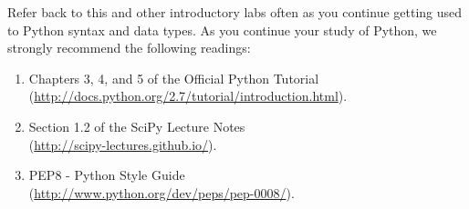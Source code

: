Refer back to this and other introductory labs often as you continue getting used to Python syntax and data types.
As you continue your study of Python, we strongly recommend the following readings:
\begin{enumerate}
\item Chapters 3, 4, and 5 of the Official Python Tutorial \\
        (\url{http://docs.python.org/2.7/tutorial/introduction.html}).
\item Section 1.2 of the SciPy Lecture Notes\\
        (\url{http://scipy-lectures.github.io/}).
\item PEP8 - Python Style Guide \\
        (\url{http://www.python.org/dev/peps/pep-0008/}).
\end{enumerate}
